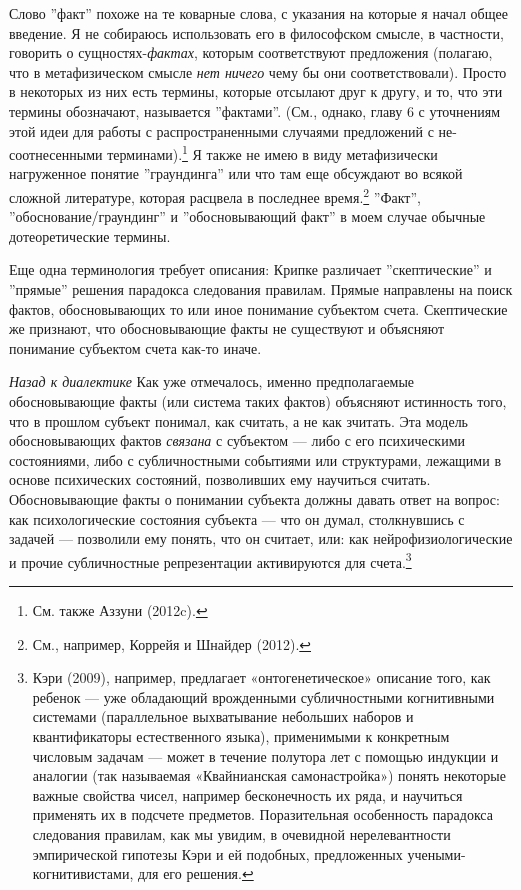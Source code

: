 \documentclass[11pt]{book}
\begin{document}
Слово ''факт'' похоже на те коварные слова, с указания на которые я начал общее введение. Я не собираюсь использовать его в философском смысле, в частности, говорить о сущностях-\textit{фактах}, которым соответствуют предложения (полагаю, что в метафизическом смысле \textit{нет ничего} чему бы они соответствовали). Просто в некоторых из них есть термины, которые отсылают друг к другу, и то, что эти термины обозначают, называется ''фактами''. (См., однако, главу 6 с уточнениям этой идеи для работы с распространенными случаями предложений с не-соотнесенными терминами).\footnote{См. также Аззуни (2012c).} Я также не имею в виду метафизически нагруженное понятие ''граундинга'' или что там еще обсуждают во всякой сложной литературе, которая расцвела в последнее время.\footnote{См., например, Коррейя и Шнайдер (2012).} ''Факт'', ''обоснование/граундинг'' и ''обосновывающий факт'' в моем случае обычные дотеоретические термины.

Еще одна терминология требует описания: Крипке различает ''скептические'' и ''прямые'' решения парадокса следования правилам. Прямые направлены на поиск фактов, обосновывающих то или иное понимание субъектом счета. Скептические же признают, что обосновывающие факты не существуют и объясняют понимание субъектом счета как-то иначе.

\textit{Назад к диалектике} \quad Как уже отмечалось, именно предполагаемые обосновывающие факты (или система таких фактов) объясняют истинность того, что в прошлом субъект понимал, как считать, а не как зчитать. Эта модель обосновывающих фактов \textit{связана} с субъектом --- либо с его психическими состояниями, либо с субличностными событиями или структурами, лежащими в основе психических состояний, позволивших ему научиться считать. Обосновывающие факты о понимании субъекта должны давать ответ на вопрос: как психологические состояния субъекта --- что он думал, столкнувшись с задачей --- позволили ему понять, что он считает, или: как нейрофизиологические и прочие субличностные репрезентации активируются для счета.\footnote{Кэри (2009), например, предлагает «онтогенетическое» описание того, как ребенок — уже обладающий врожденными субличностными когнитивными системами (параллельное выхватывание небольших наборов и квантификаторы естественного языка), применимыми к конкретным числовым задачам — может в течение полутора лет с помощью индукции и аналогии (так называемая «Квайнианская самонастройка») понять некоторые важные свойства чисел, например бесконечность их ряда, и научиться применять их в подсчете предметов. Поразительная особенность парадокса следования правилам, как мы увидим, в очевидной нерелевантности эмпирической гипотезы Кэри и ей подобных, предложенных учеными-когнитивистами, для его решения.}
\end{document}
